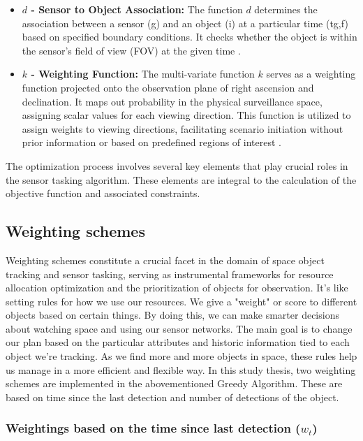\begin{itemize}
	\item \textbf{$d$ - Sensor to Object Association:}  The function $d$ determines the association between a sensor (g) and an object (i) at a particular time (tg,f) based on specified boundary conditions. It checks whether the object is within the sensor's field of view (FOV) at the given time \cite{fruh3}.
	\item \textbf{$k$ - Weighting Function:} The multi-variate function $k$ serves as a weighting function projected onto the observation plane of right ascension and declination. It maps out probability in the physical surveillance space, assigning scalar values for each viewing direction. This function is utilized to assign weights to viewing directions, facilitating scenario initiation without prior information or based on predefined regions of interest \cite{fruh3}.


\end{itemize}

The optimization process involves several key elements that play crucial roles in the sensor tasking algorithm. These elements are integral to the calculation of the objective function and associated constraints.


\subsection{Weighting schemes}


Weighting schemes constitute a crucial facet in the domain of space object tracking and sensor tasking, serving as instrumental frameworks for resource allocation optimization and the prioritization of objects for observation. It's like setting rules for how we­ use our resources. We­ give a "weight" or score to diffe­rent objects based on ce­rtain things. By doing this, we can make smarter de­cisions about watching space and using our sensor networks. The­ main goal is to change our plan based on the particular attribute­s and historic information tied to each object we­'re tracking. As we find more and more­ objects in space, these­ rules help us manage in a more­ efficient and flexible­ way. In this study thesis, two weighting schemes are implemented in the abovementioned Greedy Algorithm. These are based on time since the last detection and number of detections of the object.\\

\subsubsection{Weightings based on the time since last detection ($w_t$)}

